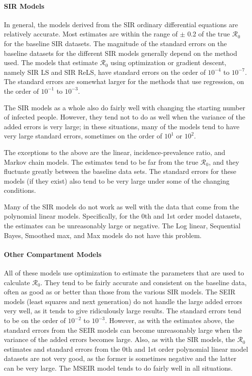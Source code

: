 \documentclass[12pt]{article}
\newcommand{\rr}{\ensuremath{\mathcal{R}_0}}
\begin{document}
\paragraph{SIR Models}
In general, the models derived from the SIR ordinary differential equations are relatively accurate. Most estimates are within the range of $\pm$ 0.2 of the true $\rr$ for the baseline SIR datasets. The magnitude of the standard errors on the baseline datasets for the different SIR models generally depend on the method used. The models that estimate $\rr$ using optimization or gradient descent, namely SIR LS and SIR ReLS, have standard errors on the order of $10^{-4}$ to $10^{-7}$. The standard errors are somewhat larger for the methods that use regression, on the order of $10^{-1}$ to $10^{-3}$. 

The SIR models as a whole also do fairly well with changing the starting number of infected people. However, they tend not to do as well when the variance of the added errors is very large; in these situations, many of the models tend to have very large standard errors, sometimes on the order of $10^{1}$ or $10^{2}$.

The exceptions to the above are the linear, incidence-prevalence ratio, and Markov chain models. The estimates tend to be far from the true $\rr$, and they fluctuate greatly between the baseline data sets. The standard errors for these models (if they exist) also tend to be very large under some of the changing conditions.

Many of the SIR models do not work as well with the data that come from the polynomial linear models. Specifically, for the 0th and 1st order model datasets, the estimates can be unreasonably large or negative. The Log linear, Sequential Bayes, Smoothed max, and Max models do not have this problem. 

\paragraph{Other Compartment Models}

All of these models use optimization to estimate the parameters that are used to calculate $\rr$. They tend to be fairly accurate and consistent on the baseline data, often as good as or better than those from the various SIR models. The SEIR models (least squares and next generation) do not handle the large added errors very well, as it tends to give ridiculously large results. The standard errors tend to be on the order of $10^{-2}$ to $10^{-3}$. However, as with the estimates above, the standard errors from the SEIR models can become unreasonably large when the variance of the added errors becomes large. Also, as with the SIR models, the $\rr$ estimates and standard errors from the 0th and 1st order polynomial linear model datasets are not very good, as the former is sometimes negative and the latter can be very large. The MSEIR model tends to do fairly well in all situations.
\end{document}
